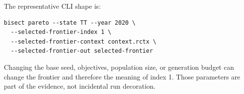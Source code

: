 The representative CLI shape is:
\begin{verbatim}
bisect pareto --state TT --year 2020 \
  --selected-frontier-index 1 \
  --selected-frontier-context context.rctx \
  --selected-frontier-out selected-frontier
\end{verbatim}
Changing the base seed, objectives, population size, or generation budget can
change the frontier and therefore the meaning of index 1. Those parameters are
part of the evidence, not incidental run decoration.
